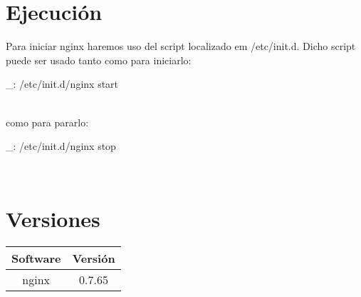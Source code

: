 \section{Ejecución}

Para iniciar nginx haremos uso del script localizado em /etc/init.d. Dicho script puede ser usado tanto como para iniciarlo:

\begin{bashcode}
_: /etc/init.d/nginx start
\end{bashcode}
\\

como para pararlo:

\begin{bashcode}
_: /etc/init.d/nginx stop
\end{bashcode}
\\


\section{Versiones}

\begin{tabular}{|c|c|}
   \hline
   Software & Versión \\ \hline
   nginx & 0.7.65 \\ \hline
\end{tabular}

